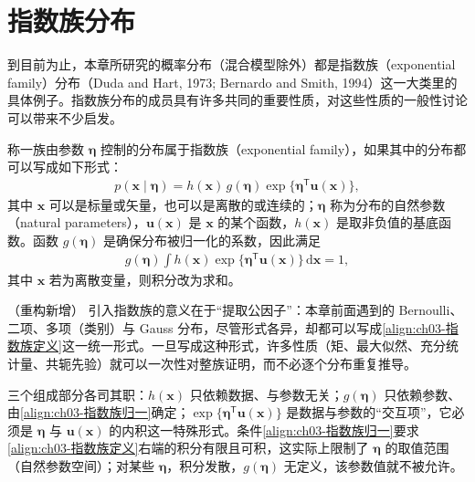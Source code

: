\documentclass[../../main.tex]{subfiles}
\begin{document}
\section{指数族分布}\label{section:ch03-指数族分布}

到目前为止，本章所研究的概率分布（混合模型除外）都是指数族（exponential family）分布（Duda and Hart, 1973; Bernardo and Smith, 1994）这一大类里的具体例子。指数族分布的成员具有许多共同的重要性质，对这些性质的一般性讨论可以带来不少启发。

\begin{definition}[指数族分布]\label{definition:ch03-指数族分布}
称一族由参数 $\boldsymbol{\eta}$ 控制的分布属于指数族（exponential family），如果其中的分布都可以写成如下形式：
\begin{align}
p(\boldsymbol{x}\mid\boldsymbol{\eta})=h(\boldsymbol{x})\,g(\boldsymbol{\eta})\exp\bigl\{\boldsymbol{\eta}^{\mathsf{T}}\boldsymbol{u}(\boldsymbol{x})\bigr\},
\label{align:ch03-指数族定义}
\end{align}
其中 $\boldsymbol{x}$ 可以是标量或矢量，也可以是离散的或连续的；$\boldsymbol{\eta}$ 称为分布的自然参数（natural parameters），$\boldsymbol{u}(\boldsymbol{x})$ 是 $\boldsymbol{x}$ 的某个函数，$h(\boldsymbol{x})$ 是取非负值的基底函数。函数 $g(\boldsymbol{\eta})$ 是确保分布被归一化的系数，因此满足
\begin{align}
g(\boldsymbol{\eta})\int h(\boldsymbol{x})\exp\bigl\{\boldsymbol{\eta}^{\mathsf{T}}\boldsymbol{u}(\boldsymbol{x})\bigr\}\,\mathrm{d}\boldsymbol{x}=1,
\label{align:ch03-指数族归一}
\end{align}
其中 $\boldsymbol{x}$ 若为离散变量，则积分改为求和。
\end{definition}

\begin{remark}（重构新增）
引入指数族的意义在于“提取公因子”：本章前面遇到的 Bernoulli、二项、多项（类别）与 Gauss 分布，尽管形式各异，却都可以写成\eqref{align:ch03-指数族定义}这一统一形式。一旦写成这种形式，许多性质（矩、最大似然、充分统计量、共轭先验）就可以一次性对整族证明，而不必逐个分布重复推导。

三个组成部分各司其职：$h(\boldsymbol{x})$ 只依赖数据、与参数无关；$g(\boldsymbol{\eta})$ 只依赖参数、由\eqref{align:ch03-指数族归一}确定；$\exp\{\boldsymbol{\eta}^{\mathsf{T}}\boldsymbol{u}(\boldsymbol{x})\}$ 是数据与参数的“交互项”，它必须是 $\boldsymbol{\eta}$ 与 $\boldsymbol{u}(\boldsymbol{x})$ 的内积这一特殊形式。条件\eqref{align:ch03-指数族归一}要求\eqref{align:ch03-指数族定义}右端的积分有限且可积，这实际上限制了 $\boldsymbol{\eta}$ 的取值范围（自然参数空间）；对某些 $\boldsymbol{\eta}$，积分发散，$g(\boldsymbol{\eta})$ 无定义，该参数值就不被允许。
\end{remark}
\end{document}
